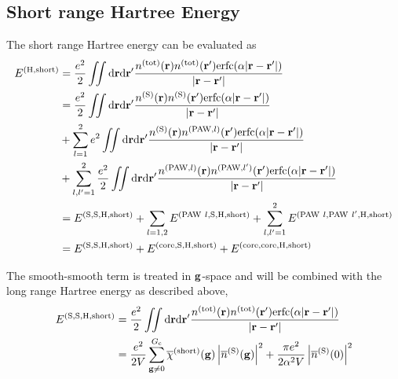 \documentclass[paper=a4, fontsize=11pt]{article} %
\numberwithin{equation}{section} %
\numberwithin{figure}{section} %
\numberwithin{table}{section} %
\newcommand{\ol}{\overline}
\newcommand{\bg}{{\bf{g}}}
\newcommand{\br}{{\bf{r}}}
\newcommand{\rS}{{\mathrm{S}}}
\newcommand{\rcore}{{\mathrm{core}}}
\newcommand{\rshort}{{\mathrm{short}}}
\newcommand{\rerfc}{{\mathrm{erfc}}}
\newcommand{\rP}{{\mathrm{PAW}}}
\newcommand{\rd}{{\mathrm{d}}}
\newcommand{\rH}{{\mathrm{H}}}
\newcommand{\rtot}{{\mathrm{tot}}}
\newcommand{\Gc}{{G_{\mathrm{c}}}}
\begin{document}
\subsection{Short range Hartree Energy}
The short range Hartree energy can be evaluated as
\begin{equation}\label{eq:Hshort}
\begin{split}
E^{(\rH,\rshort)}
&= \frac{e^2}{2}\iint \rd\br \rd\br'\frac{n^{(\rtot)}(\br)n^{(\rtot)}(\br')\rerfc(\alpha|\br-\br'|)}{|\br-\br'|} \\
&= \frac{e^2}{2}\iint \rd\br \rd\br'\frac{n^{(\rS)}(\br)n^{(\rS)}(\br')\rerfc(\alpha|\br-\br'|)}{|\br-\br'|} \\
&+ \sum_{l=1}^2 e^2 \iint \rd\br \rd\br'\frac{n^{(\rS)}(\br)n^{(\rP,l)}(\br')\rerfc(\alpha|\br-\br'|)}{|\br-\br'|}\\
&+\sum_{l,l'=1}^2 \frac{e^2}{2}\iint \rd\br \rd\br'\frac{n^{(\rP,l)}(\br)n^{(\rP,l')}(\br')\rerfc(\alpha|\br-\br'|)}{|\br-\br'|} \\
&= E^{(\rS,\rS,\rH,\rshort)} + \sum_{l=1,2} E^{(\rP\ l,\rS,\rH,\rshort)} + \sum_{l,l'=1}^2 E^{(\rP\ l,\rP\ l',\rH,\rshort)}\\
&=E^{(\rS,\rS,\rH,\rshort)} + E^{(\rcore,\rS,\rH,\rshort)}+E^{(\rcore,\rcore,\rH,\rshort)}
\end{split}
\end{equation}


The smooth-smooth term is treated in $\bg$-space and will be combined with the long range Hartree energy as described above,
\begin{equation}
\begin{split}
E^{(\rS,\rS,\rH,\rshort)} 
&=\frac{e^2}{2}\iint \rd\br \rd\br'\frac{n^{(\rtot)}(\br)n^{(\rtot)}(\br')\rerfc(\alpha|\br-\br'|)}{|\br-\br'|}  \\
&=\frac{e^2}{2V} \sum_{\bg \neq 0}^{\Gc} \ol \chi^{(\rshort)} (\bg)\left|\overline{n}^{(\rS)}(\bg)\right|^2+\frac{\pi e^2}{2\alpha^2 V}\left|\overline{n}^{(\rS)}(0)\right|^2\\
\end{split}
\end{equation}
\end{document}
